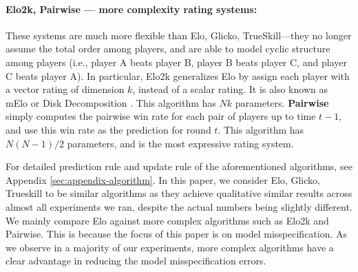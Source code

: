 

\paragraph{Elo2k, Pairwise --- more complexity rating systems:} These systems are much more flexible than Elo, Glicko, TrueSkill---they no longer assume the total order among players, and are able to model cyclic structure among players (i.e., player A beats player B, player B beats player C, and player C beats player A). In particular, Elo2k generalizes Elo by assign each player with a vector rating of dimension $k$, instead of a scalar rating. It is also known as mElo  \citep{balduzzi2018re} or Disk Decomposition \citep{bertrand2023limitations}. This algorithm has $Nk$ parameters. \textbf{Pairwise} simply computes the pairwise win rate for each pair of players up to time $t-1$, and use this win rate as the prediction for round $t$. This algorithm has $N(N-1)/2$ parameters, and is the most expressive rating system.

For detailed prediction rule and update rule of the aforementioned algorithms, see Appendix \ref{sec:appendix-algorithm}. In this paper, we consider Elo, Glicko, Trueskill to be similar algorithms as they achieve qualitative similar results across almost all experiments we ran, despite the actual numbers being slightly different. We mainly compare Elo against more complex algorithms such as Elo2k and Pairwise. This is because the focus of this paper is on model misspecification. As we observe in a majority of our experiments, more complex algorithms have a clear advantage in reducing the model misspecification errors.



